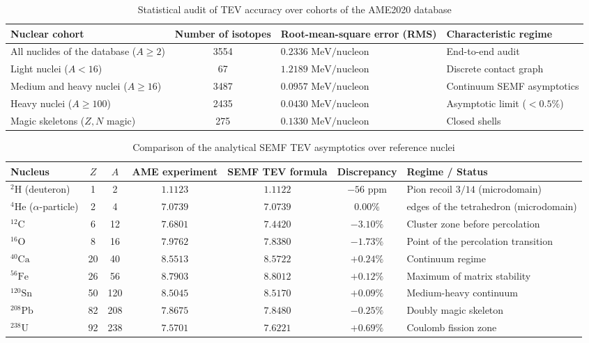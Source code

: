 \documentclass[11pt,a4paper]{article}
\theoremstyle{definition}
\theoremstyle{remark}
\begin{document}
\begin{table}[H]
\centering
\small
\setlength{\tabcolsep}{5pt}
\caption{Statistical audit of TEV accuracy over cohorts of the AME2020 database}
\label{tab:ame2020_statistical_audit}
\vspace{2mm}
\begin{tabularx}{\textwidth}{>{\raggedright\arraybackslash}p{4.5cm} c >{\centering\arraybackslash}p{3.0cm} >{\centering\arraybackslash}X}
	\toprule
	Nuclear cohort & Number of isotopes & Root-mean-square error (RMS) & Characteristic regime \\
	\midrule
All nuclides of the database ($A \ge 2$) & 3554 & $0.2336\text{ MeV/nucleon}$ & End-to-end audit \\
Light nuclei ($A < 16$) & 67 & $1.2189\text{ MeV/nucleon}$ & Discrete contact graph \\
Medium and heavy nuclei ($A \ge 16$) & 3487 & $0.0957\text{ MeV/nucleon}$ & Continuum SEMF asymptotics \\
Heavy nuclei ($A \ge 100$) & 2435 & $0.0430\text{ MeV/nucleon}$ & Asymptotic limit ($< 0.5\%$) \\
Magic skeletons ($Z, N$ magic) & 275 & $0.1330\text{ MeV/nucleon}$ & Closed shells \\
\bottomrule
\end{tabularx}
\end{table}

\begin{table}[H]
\centering
\small
\setlength{\tabcolsep}{4pt}
\caption{Comparison of the analytical SEMF TEV asymptotics over reference nuclei}
\label{tab:benchmarks_ame2020}
\vspace{2mm}
\begin{tabularx}{\textwidth}{l c c c c c >{\raggedright\arraybackslash}X}
\toprule
Nucleus & $Z$ & $A$ & AME experiment & SEMF TEV formula & Discrepancy & Regime / Status \\
\midrule
	$^2\mathrm{H}$ (deuteron) & 1 & 2 & $1.1123$ & $1.1122$ & $-56\text{ ppm}$ & Pion recoil $3/14$ (microdomain) \\
	$^4\mathrm{He}$ ($\alpha$-particle) & 2 & 4 & $7.0739$ & $7.0739$ & $0.00\%$ & 6 edges of the tetrahedron (microdomain) \\
	$^{12}\mathrm{C}$ & 6 & 12 & $7.6801$ & $7.4420$ & $-3.10\%$ & Cluster zone before percolation \\
	$^{16}\mathrm{O}$ & 8 & 16 & $7.9762$ & $7.8380$ & $-1.73\%$ & Point of the percolation transition \\
	$^{40}\mathrm{Ca}$ & 20 & 40 & $8.5513$ & $8.5722$ & $+0.24\%$ & Continuum regime \\
	$^{56}\mathrm{Fe}$ & 26 & 56 & $8.7903$ & $8.8012$ & $+0.12\%$ & Maximum of matrix stability \\
	$^{120}\mathrm{Sn}$ & 50 & 120 & $8.5045$ & $8.5170$ & $+0.09\%$ & Medium-heavy continuum \\
	$^{208}\mathrm{Pb}$ & 82 & 208 & $7.8675$ & $7.8480$ & $-0.25\%$ & Doubly magic skeleton \\
	$^{238}\mathrm{U}$ & 92 & 238 & $7.5701$ & $7.6221$ & $+0.69\%$ & Coulomb fission zone \\
\bottomrule
\end{tabularx}
\end{table}
\end{document}
